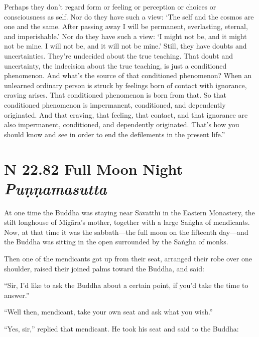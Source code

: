 \documentclass[12pt,openany]{book}%
\newcommand*{\suttatitleacronym}[1]{\smaller[2]{#1}\vspace*{.3em}}
\newcommand*{\suttatitletranslation}[1]{\linebreak{#1}}
\newcommand*{\suttatitleroot}[1]{\linebreak\smaller[2]\itshape{#1}}
\newcommand*{\tocacronym}[1]{\hspace*{-3.3em}{#1}\quad}
\newcommand*{\toctranslation}[1]{#1}
\newcommand*{\tocroot}[1]{(\textit{#1})}
\begin{document}
Perhaps they don’t regard form or feeling or perception or choices or consciousness as self. Nor do they have such a view: ‘The self and the cosmos are one and the same. After passing away I will be permanent, everlasting, eternal, and imperishable.’ Nor do they have such a view: ‘I might not be, and it might not be mine. I will not be, and it will not be mine.’ Still, they have doubts and uncertainties. They’re undecided about the true teaching. That doubt and uncertainty, the indecision about the true teaching, is just a conditioned phenomenon. And what’s the source of that conditioned phenomenon? When an unlearned ordinary person is struck by feelings born of contact with ignorance, craving arises. That conditioned phenomenon is born from that. So that conditioned phenomenon is impermanent, conditioned, and dependently originated. And that craving, that feeling, that contact, and that ignorance are also impermanent, conditioned, and dependently originated. That’s how you should know and see in order to end the defilements in the present life.” 

%
\section*{{\suttatitleacronym SN 22.82}{\suttatitletranslation A Full Moon Night }{\suttatitleroot Puṇṇamasutta}}
\addcontentsline{toc}{section}{\tocacronym{SN 22.82} \toctranslation{A Full Moon Night } \tocroot{Puṇṇamasutta}}

At one time the Buddha was staying near \textsanskrit{Sāvatthī} in the Eastern Monastery, the stilt longhouse of \textsanskrit{Migāra}’s mother, together with a large \textsanskrit{Saṅgha} of mendicants. Now, at that time it was the sabbath—the full moon on the fifteenth day—and the Buddha was sitting in the open surrounded by the \textsanskrit{Saṅgha} of monks. 

Then one of the mendicants got up from their seat, arranged their robe over one shoulder, raised their joined palms toward the Buddha, and said: 

“Sir, I’d like to ask the Buddha about a certain point, if you’d take the time to answer.” 

“Well then, mendicant, take your own seat and ask what you wish.” 

“Yes, sir,” replied that mendicant. He took his seat and said to the Buddha: 
\end{document}
